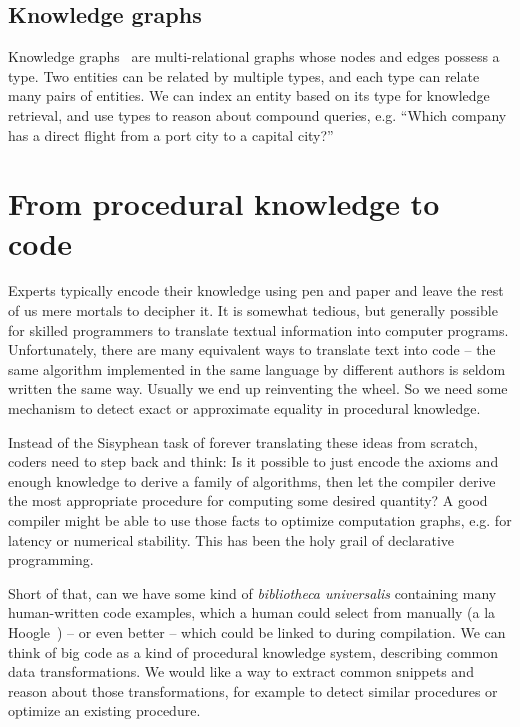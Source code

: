 \documentclass[11pt]{article}
\begin{document}
    \subsection{Knowledge graphs}

    Knowledge graphs~\citep{hogan2020knowledge} are multi-relational graphs whose nodes and edges possess a type. Two entities can be related by multiple types, and each type can relate many pairs of entities. We can index an entity based on its type for knowledge retrieval, and use types to reason about compound queries, e.g. ``Which company has a direct flight from a port city to a capital city?''

%

    \pagebreak


    \section{From procedural knowledge to code}\label{sec:applications}

    Experts typically encode their knowledge using pen and paper and leave the rest of us mere mortals to decipher it. It is somewhat tedious, but generally possible for skilled programmers to translate textual information into computer programs. Unfortunately, there are many equivalent ways to translate text into code -- the same algorithm implemented in the same language by different authors is seldom written the same way. Usually we end up reinventing the wheel. So we need some mechanism to detect exact or approximate equality in procedural knowledge.

    Instead of the Sisyphean task of forever translating these ideas from scratch, coders need to step back and think: Is it possible to just encode the axioms and enough knowledge to derive a family of algorithms, then let the compiler derive the most appropriate procedure for computing some desired quantity? A good compiler might be able to use those facts to optimize computation graphs, e.g. for latency or numerical stability. This has been the holy grail of declarative programming.

    Short of that, can we have some kind of \textit{bibliotheca universalis} containing many human-written code examples, which a human could select from manually (a la Hoogle~\citep{james2020digging}) -- or even better -- which could be linked to during compilation. We can think of big code as a kind of procedural knowledge system, describing common data transformations. We would like a way to extract common snippets and reason about those transformations, for example to detect similar procedures or optimize an existing procedure.
\end{document}
